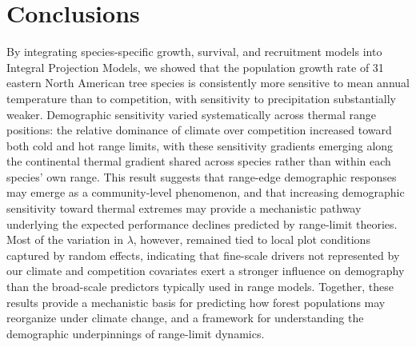\hypertarget{conclusions}{%
\section{Conclusions}\label{conclusions}}

By integrating species-specific growth, survival, and recruitment models
into Integral Projection Models, we showed that the population growth
rate of 31 eastern North American tree species is consistently more
sensitive to mean annual temperature than to competition, with
sensitivity to precipitation substantially weaker. Demographic
sensitivity varied systematically across thermal range positions: the
relative dominance of climate over competition increased toward both
cold and hot range limits, with these sensitivity gradients emerging
along the continental thermal gradient shared across species rather than
within each species' own range. This result suggests that range-edge
demographic responses may emerge as a community-level phenomenon, and
that increasing demographic sensitivity toward thermal extremes may
provide a mechanistic pathway underlying the expected performance
declines predicted by range-limit theories. Most of the variation in
\(\lambda\), however, remained tied to local plot conditions captured by
random effects, indicating that fine-scale drivers not represented by
our climate and competition covariates exert a stronger influence on
demography than the broad-scale predictors typically used in range
models. Together, these results provide a mechanistic basis for
predicting how forest populations may reorganize under climate change,
and a framework for understanding the demographic underpinnings of
range-limit dynamics.\\

\singlespacing
{\renewcommand{\bibname}{References}
\renewcommand{\bibsection}{\section{\bibname}}
}


